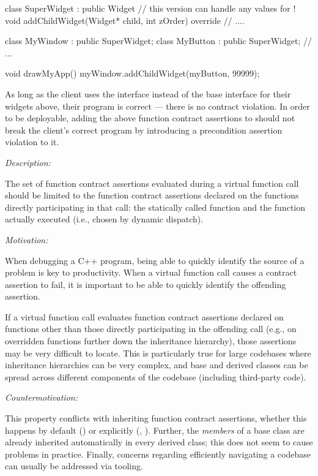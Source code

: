 \begin{codeblock}
class SuperWidget : public Widget {
  // this version can handle any values for !
  void addChildWidget(Widget* child, int zOrder) override {
    // ....
  } 
}

class MyWindow : public SuperWidget;
class MyButton : public SuperWidget;
// ...

void drawMyApp() {
  myWindow.addChildWidget(myButton, 99999);
}
\end{codeblock}
As long as the client uses the  interface instead of the base  interface for their widgets above, their program is correct --- there is no contract violation. In order to be deployable, adding the above function contract assertions to \allowbreak{} should not break the client's correct program by introducing a precondition assertion violation to it.


\emph{Description:}

The set of function contract assertions evaluated during a virtual function call should be limited to the function contract assertions declared on the functions directly participating in that call: the statically called function and the function actually executed (i.e., chosen by dynamic dispatch). 

\emph{Motivation:}

When debugging a C++ program, being able to quickly identify the source of a problem is key to productivity. When a virtual function call causes a contract assertion to fail, it is important to be able to quickly identify the offending assertion.

If a virtual function call evaluates function contract assertions declared on functions other than those directly participating in the offending call (e.g., on overridden functions further down the inheritance hierarchy), those assertions may be very difficult to locate. This is particularly true for large codebases where inheritance hierarchies can be very complex, and base and derived classes can be spread across different components of the codebase (including third-party code).

\emph{Countermotivation:}

This property conflicts with inheriting function contract assertions, whether this happens by default () or explicitly (, ). Further, the \emph{members} of a base class are already inherited automatically in every derived class; this does not seem to cause problems in practice. Finally, concerns regarding efficiently navigating a codebase can usually be addressed via tooling.

